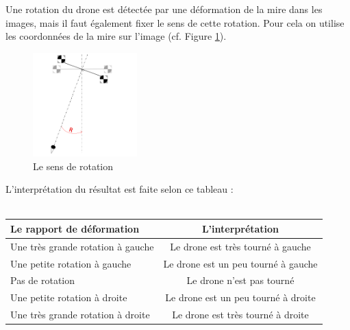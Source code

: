 \documentclass[12pt]{article}
\begin{document}
\begin{enumerate}
            Une rotation du drone est détectée par une déformation de la mire dans les images, mais il faut également fixer le sens de cette rotation. Pour cela on utilise les coordonnées de la mire sur l'image (cf. Figure \ref{fig:rotation}).\\ 
            
            \begin{figure}[H]
            \centering
            \includegraphics[height=4cm]{rotation.png}
            \caption{Le sens de rotation}
            \label{fig:rotation}
            \end{figure}
            
            L'interprétation du résultat est faite selon ce tableau : \\\\
            \begin{tabular}{|l|c|}
            \hline
            Le rapport de déformation & L’interprétation\\
            \hline
            Une très grande rotation à gauche & Le drone est très tourné à gauche \\
            Une petite rotation à gauche&Le drone est un peu tourné à gauche \\
            Pas de rotation & Le drone n’est pas tourné  \\
            Une petite rotation à droite & Le drone est un peu tourné à droite \\
            Une très grande rotation à droite  & Le drone est très tourné à droite\\
            \hline
            \end{tabular}\\\\
    \end{enumerate}
        
  
    
\end{document}
